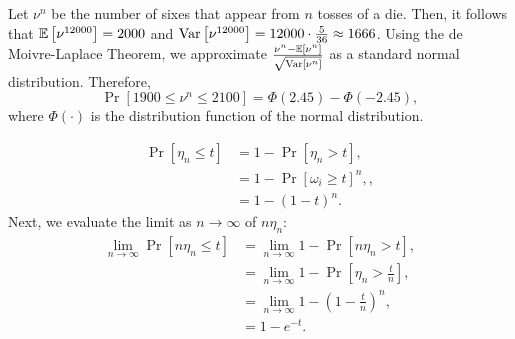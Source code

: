 \begin{problem}{5}
\end{problem}
\begin{solution}
    Let $\nu^n$ be the number of sixes that appear from $n$ tosses of a die. Then, it follows that $\mathbb{E}\left[\nu^{12000}\right] = 2000$ and $\operatorname{Var}\left[{\nu^{12000}}\right] = 12000\cdot\frac{5}{36} \approx 1666$. Using the de Moivre-Laplace Theorem, we approximate $\frac{\nu^n - \mathbb{E}\left[\nu^n\right]}{\sqrt{\operatorname{Var}[\nu^n]}}$ as a standard normal distribution. Therefore,
    \[\Pr[1900 \leq \nu^n \leq 2100] = \Phi(2.45) - \Phi(-2.45),\]
    where $\Phi(\cdot)$ is the distribution function of the normal distribution.
\end{solution}
\begin{problem}{6}
\end{problem}
\begin{solution}
    \begin{align*}
        \Pr[\eta_n \leq t] &= 1 - \Pr[\eta_n > t], \\
        &= 1 - \Pr[\omega_i \geq t]^n, \tag{by i.i.d.}, \\
        &= 1 - (1-t)^n.
    \end{align*}
    Next, we evaluate the limit as $n\to\infty$ of $n\eta_n$:
    \begin{align*}
        \lim_{n\to\infty} \Pr[n\eta_n \leq t] &= \lim_{n\to\infty} 1 - \Pr[n\eta_n > t], \\
        &= \lim_{n\to\infty} 1 - \Pr\left[\eta_n > \frac{t}{n}\right], \\
        &= \lim_{n\to\infty} 1 - \left(1 - \frac{t}{n}\right)^n, \\
        &= 1-e^{-t}.
    \end{align*}
\end{solution}
\begin{problem}{7}
    
\end{problem}
\begin{solution}
    
\end{solution}
\begin{problem}{8}
\end{problem}
